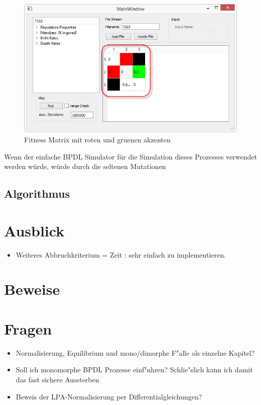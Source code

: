 \documentclass[11pt, a4paper, german]{article}
\begin{document}
\begin{figure}[H]
	\centering
	\includegraphics[width=0.7\linewidth]{./Pictures/MainWindow_red_green_loaded}
	\caption[MainWindow_redGreenFitness]{Fitness Matrix mit roten und gruenen akzenten}
	\label{fig:MainWindow_red_green_loaded}
\end{figure}
Wenn der einfache BPDL Simulator für die Simulation dieses Prozesses verwendet werden würde, würde durch die seltenen Mutationen
	
	\subsection{Algorithmus}
\clearpage
\section{Ausblick}

\begin{itemize}
	\item Weiteres Abbruchkriterium = Zeit : sehr einfach zu implementieren.
\end{itemize}

\clearpage


\clearpage

\section{Beweise}


\section{Fragen}
\begin{itemize}
	\item Normalisierung, Equilibrium und mono/dimorphe F"alle als einzelne Kapitel?
	\item Soll ich monomorphe BPDL Prozesse einf"uhren? Schlie"slich kann ich damit das fast sichere Aussterben 
	\item Beweis der LPA-Normalisierung per Differentialgleichungen?
\end{itemize}
\end{document}
